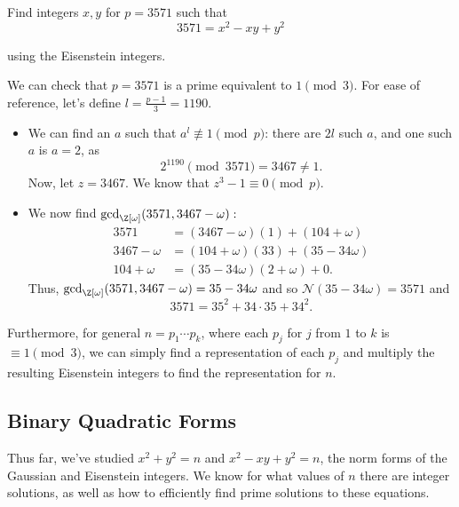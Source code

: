 \documentclass[11pt]{article}
\begin{document}
\begin{eg}
Find integers $x, y$ for $p = 3571$ such that
\[
    3571 = x^2 - xy + y^2
\]

using the Eisenstein integers.
\end{eg}

\begin{answer}
We can check that $p = 3571$ is a prime equivalent to $1 \pmod 3$. For ease of reference, let's define $l = \frac{p-1}{3} = 1190$.
\begin{itemize}
    \item We can find an $a$ such that $a^l \not\equiv 1 \pmod p$: there are $2l$ such $a$, and one such $a$ is $a=2$, as
    \[
        2^{1190} \pmod{3571} = 3467 \neq 1.
    \]
    Now, let $z = 3467$. We know that $z^3 - 1 \equiv 0 \pmod p$. 
    \item We now find $\mathrm{gcd}_{\Z[\omega]}(3571, 3467-\omega):$
    \begin{align*}
        3571 &= (3467-\omega)(1) + (104 + \omega) \\
        3467 - \omega &= (104 + \omega)(33) + (35 - 34\omega) \\
        104 + \omega &= (35 - 34\omega)(2+\omega) + 0.
    \end{align*}
    Thus, $\mathrm{gcd}_{\Z[\omega]}(3571, 3467-\omega) = 35 - 34\omega$ and so $\mathcal{N}(35 - 34\omega) = 3571$ and
    \[
        \boxed{3571 = 35^2 + 34\cdot35 + 34^2}.
    \]
\end{itemize}
\end{answer}



\begin{remark}
    Furthermore, for general $n = p_1 \cdots p_k$, where each $p_j$ for $j$ from $1$ to $k$ is $\equiv 1 \pmod{3}$,
    we can simply find a representation of each $p_j$ and multiply the resulting Eisenstein integers to find the representation for $n$.    
\end{remark}

\subsection{Binary Quadratic Forms}

Thus far, we've studied $x^2 + y^2 = n$ and $x^2 - xy + y^2 = n$, the norm forms of the Gaussian and Eisenstein integers. 
We know for what values of $n$ there are integer solutions, as well as how to efficiently find prime solutions to these equations. \\
\end{document}
